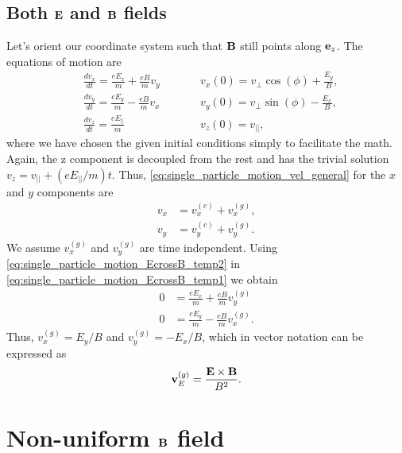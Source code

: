 \documentclass[a4paper,11pt]{report}
\begin{document}
\subsection{Both $\mathbf{E}$ and $\mathbf{B}$ fields}
\label{sec:E_and_B_field}
Let's orient our coordinate system such that $\mathbf{B}$ still points along $\mathbf{e}_z$. The equations of motion are
\begin{subequations}
\label{eq:single_particle_motion_EcrossB_temp1}
\begin{alignat}{2}
    &\frac{d v_x}{dt} = \frac{eE_x}{m} + \frac{eB}{m} v_y  \qquad && v_x(0) = v_\perp \cos(\phi) + \frac{E_y}{B}, \label{eq:E_and_B_1} \\
    &\frac{d v_y}{dt} = \frac{eE_y}{m} - \frac{eB}{m} v_x  \qquad && v_y(0) = v_\perp \sin(\phi) - \frac{E_x}{B}, \label{eq:E_and_B_2} \\
    &\frac{d v_z}{dt} = \frac{e E_{||}}{m}  \qquad && v_z(0) = v_{||}, \label{eq:E_and_B_3}
\end{alignat}
\end{subequations}
where we have chosen the given initial conditions simply to facilitate the math. Again, the z component is decoupled from the rest and has the trivial solution $v_z = v_{||} +  (eE_{||}/m) t$. Thus, \cref{eq:single_particle_motion_vel_general} for the $x$ and $y$ components are
\begin{align}
    \label{eq:single_particle_motion_EcrossB_temp2}
    v_x &= v_x^{(c)} + v^{(g)}_x, \nonumber \\
    v_y &= v_y^{(c)} + v^{(g)}_y.
\end{align}
We assume $v^{(g)}_x$ and $v^{(g)}_y$ are time independent. Using \cref{eq:single_particle_motion_EcrossB_temp2} in \cref{eq:single_particle_motion_EcrossB_temp1} we obtain
\begin{align}
    0 &= \frac{eE_x}{m} + \frac{eB}{m}v^{(g)}_y \nonumber \\
    0 &= \frac{eE_y}{m} - \frac{eB}{m}v^{(g)}_x.
\end{align}
Thus, $v^{(g)}_x = E_y/B$ and $v^{(g)}_y = -E_x/B$, which in vector notation can be expressed as
\begin{equation}
    \mathbf{v}^{(g)}_E = \frac{\mathbf{E} \times \mathbf{B}}{B^2}.
\end{equation}

\section{Non-uniform $\mathbf{B}$ field}
\end{document}
